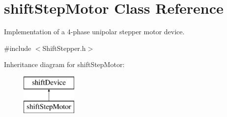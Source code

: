 \hypertarget{classshift_step_motor}{
\section{shiftStepMotor Class Reference}
\label{classshift_step_motor}
}


Implementation of a 4-\/phase unipolar stepper motor device.  




{\ttfamily \#include $<$ShiftStepper.h$>$}

Inheritance diagram for shiftStepMotor:\begin{figure}[H]
\begin{center}
\leavevmode
\includegraphics[height=2.000000cm]{classshift_step_motor}
\end{center}
\end{figure}
